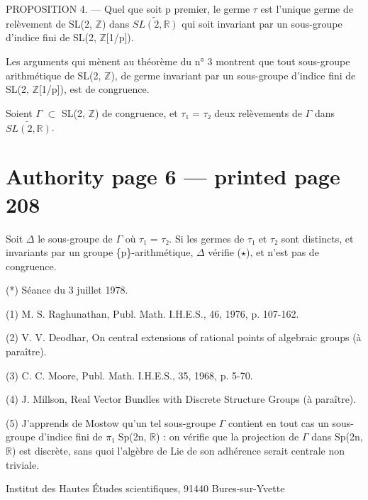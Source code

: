 \documentclass[10pt,a4paper]{article}
\begin{document}
\smallskip
\noindent PROPOSITION 4. — Quel que soit p premier, le germe \ensuremath{τ} est l'unique germe de relèvement de SL(2, \ensuremath{ℤ}) dans \ensuremath{\widetilde{SL(2, ℝ)}} qui soit invariant par un sous-groupe d'indice fini de SL(2, \ensuremath{ℤ}[1/p]).\par
\smallskip
\noindent Les arguments qui mènent au théorème du n° 3 montrent que tout sous-groupe arithmétique de SL(2, \ensuremath{ℤ}), de germe invariant par un sous-groupe d'indice fini de SL(2, \ensuremath{ℤ}[1/p]), est de congruence.\par
\smallskip
\noindent Soient \ensuremath{Γ} \ensuremath{⊂} SL(2, \ensuremath{ℤ}) de congruence, et \ensuremath{τ₁} = \ensuremath{τ₂} deux relèvements de \ensuremath{Γ} dans \ensuremath{\widetilde{SL(2, ℝ)}}.\par
\clearpage
{}\hypertarget{authority-page-0006}{}
\section*{Authority page 6 --- printed page 208}
\noindent Soit \ensuremath{Δ} le sous-groupe de \ensuremath{Γ} où \ensuremath{τ₁} = \ensuremath{τ₂}. Si les germes de \ensuremath{τ₁} et \ensuremath{τ₂} sont distincts, et invariants par un groupe \{p\}-arithmétique, \ensuremath{Δ} vérifie (\ensuremath{\star}), et n'est pas de congruence.\par
\smallskip
\noindent (*) Séance du 3 juillet 1978.\par
\smallskip
\noindent (1) M. S. Raghunathan, Publ. Math. I.H.E.S., 46, 1976, p. 107-162.\par
\smallskip
\noindent (2) V. V. Deodhar, On central extensions of rational points of algebraic groups (à paraître).\par
\smallskip
\noindent (3) C. C. Moore, Publ. Math. I.H.E.S., 35, 1968, p. 5-70.\par
\smallskip
\noindent (4) J. Millson, Real Vector Bundles with Discrete Structure Groups (à paraître).\par
\smallskip
\noindent (5) J'apprends de Mostow qu'un tel sous-groupe \ensuremath{Γ} contient en tout cas un sous-groupe d'indice fini de \ensuremath{π₁} Sp(2n, \ensuremath{ℝ}) : on vérifie que la projection de \ensuremath{Γ} dans Sp(2n, \ensuremath{ℝ}) est discrète, sans quoi l'algèbre de Lie de son adhérence serait centrale non triviale.\par
\smallskip
\noindent Institut des Hautes Études scientifiques, 91440 Bures-sur-Yvette\par
\end{document}
